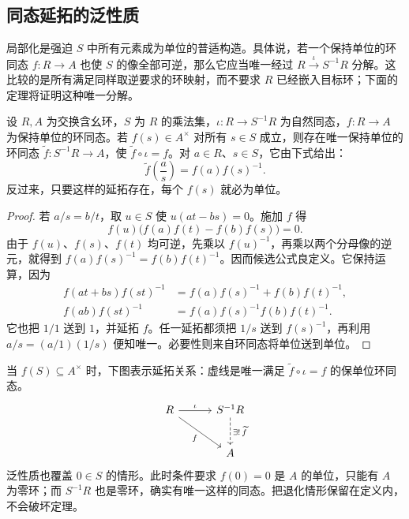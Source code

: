 \subsection{同态延拓的泛性质}
\label{b1:subsec:1302:03}

局部化是强迫 \(S\) 中所有元素成为单位的普适构造。具体说，若一个保持单位的环同态 \(f:R\rightarrow A\) 也使 \(S\) 的像全部可逆，那么它应当唯一经过 \(R\xrightarrow{\iota}S^{-1}R\) 分解。这比较的是所有满足同样取逆要求的环映射，而不要求 \(R\) 已经嵌入目标环；下面的定理将证明这种唯一分解。

\begin{theorem}\label{b1:thm:localization-universal}
	设 \(R,A\) 为交换含幺环，\(S\) 为 \(R\) 的乘法集，\(\iota:R\rightarrow S^{-1}R\) 为自然同态，\(f:R\rightarrow A\) 为保持单位的环同态。若 \(f(s)\in A^\times\) 对所有 \(s\in S\) 成立，则存在唯一保持单位的环同态 \(\widetilde f:S^{-1}R\rightarrow A\)，使 \(\widetilde f\circ\iota=f\)。对 \(a\in R\)、\(s\in S\)，它由下式给出：
	\[
		\widetilde f\left(\frac as\right)=f(a)f(s)^{-1}.
	\]
	反过来，只要这样的延拓存在，每个 \(f(s)\) 就必为单位。
\end{theorem}
\begin{proof}
	若 \(a/s=b/t\)，取 \(u\in S\) 使 \(u(at-bs)=0\)。施加 \(f\) 得
	\[
		f(u)\bigl(f(a)f(t)-f(b)f(s)\bigr)=0.
	\]
	由于 \(f(u)\)、\(f(s)\)、\(f(t)\) 均可逆，先乘以 \(f(u)^{-1}\)，再乘以两个分母像的逆元，就得到 \(f(a)f(s)^{-1}=f(b)f(t)^{-1}\)。因而候选公式良定义。它保持运算，因为
	\[
		\begin{aligned}
			f(at+bs)f(st)^{-1} &=f(a)f(s)^{-1}+f(b)f(t)^{-1},\\
			f(ab)f(st)^{-1} &=f(a)f(s)^{-1}f(b)f(t)^{-1}.
		\end{aligned}
	\]
	它也把 \(1/1\) 送到 \(1\)，并延拓 \(f\)。任一延拓都须把 \(1/s\) 送到 \(f(s)^{-1}\)，再利用 \(a/s=(a/1)(1/s)\) 便知唯一。必要性则来自环同态将单位送到单位。
\end{proof}

当 \(f(S)\subseteq A^\times\) 时，下图表示延拓关系：虚线是唯一满足 \(\widetilde f\circ\iota=f\) 的保单位环同态。
\[
	\begin{tikzcd}[column sep=3em,row sep=2.5em]
		R\arrow[r,"\iota"]\arrow[dr,"f"']&S^{-1}R\arrow[d,dashed,"\exists!\,\widetilde f"]\\
		&A
	\end{tikzcd}
\]
泛性质也覆盖 \(0\in S\) 的情形。此时条件要求 \(f(0)=0\) 是 \(A\) 的单位，只能有 \(A\) 为零环；而 \(S^{-1}R\) 也是零环，确实有唯一这样的同态。把退化情形保留在定义内，不会破坏定理。

